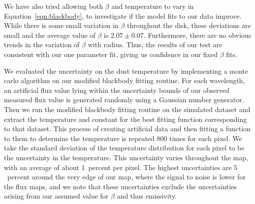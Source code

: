 \documentclass[useAMS,usenatbib,usegraphicx]{mn2e}
\begin{document}
We have also tried allowing both $\beta$ and temperature to vary in Equation~\ref{eqn:blackbody}, to investigate if the model fits to our data improve.  While there is some small variation in $\beta$ throughout the disk, these deviations are small and the average value of $\beta$ is $2.07 \pm 0.07$.  Furthermore, there are no obvious trends in the variation of $\beta$ with radius.  Thus, the results of our test are consistent with our one parameter fit, giving us confidence in our fixed $\beta$ fits.

We evaluated the uncertainty on the dust temperature by implementing a monte carlo algorithm on our modified blackbody fitting routine.  For each wavelength, an artificial flux value lying within the uncertainty bounds of our observed measured flux value is generated randomly using a Gaussian number generator.  Then we run the modified blackbody fitting routine on the simulated dataset and extract the temperature and constant for the best fitting function corresponding to that dataset.  This process of creating artificial data and then fitting a function to them to determine the temperature is repeated 800 times for each pixel.  We take the standard deviation of the temperature distribution for each pixel to be the uncertainty in the temperature.  This uncertainty varies throughout the map, with an average of about 1~percent per pixel.  The highest uncertainties are $5$~percent around the very edge of our map, where the signal to noise is lower for the flux maps, and we note that these uncertainties exclude the uncertainties arising from our assumed value for $\beta$ and thus emissivity.
\end{document}
